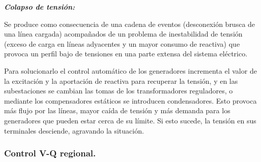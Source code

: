 				\textit{\textbf{Colapso de tensión:}}
				
				
				Se produce como consecuencia de una cadena de eventos (desconexión brusca de una línea cargada) acompañados de un problema de inestabilidad de tensión (exceso de carga en líneas adyacentes y un mayor consumo de reactiva) que provoca un perfil bajo de tensiones en una parte extensa del sistema eléctrico. 
				
				
				Para solucionarlo el control automático de los generadores incrementa el valor de la excitación y la aportación de reactiva para recuperar la tensión, y en las subestaciones se cambian las tomas de los transformadores reguladores, o mediante los compensadores estáticos se
				introducen condensadores. Esto provoca más flujo por las líneas, mayor caída de tensión y más demanda para los generadores que
				pueden estar cerca de su límite. Si esto sucede, la tensión en sus terminales desciende, agravando la situación.
				
			\subsubsection{Control V-Q regional.}
				
